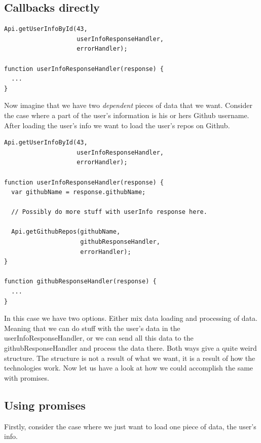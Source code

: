 \documentclass[a4paper,12pt]{article}
\begin{document}
\subsection{Callbacks directly}

\begin{lstlisting}[caption=Pseudo code showing a callback only approach, frame=single]
Api.getUserInfoById(43, 
                    userInfoResponseHandler, 
                    errorHandler);

function userInfoResponseHandler(response) {
  ...
}
\end{lstlisting}

Now imagine that we have two \emph{dependent} pieces of data that we want. Consider the case where a part of the user's information is
his or hers Github username. After loading the user's info we want to load the user's repos on Github.

\begin{lstlisting}[caption=Pseudo code showing a callback only approach where we are loading two pieces of data\, where the second is dependent on the first, frame=single]
Api.getUserInfoById(43, 
                    userInfoResponseHandler, 
                    errorHandler);

function userInfoResponseHandler(response) {
  var githubName = response.githubName;

  // Possibly do more stuff with userInfo response here.

  Api.getGithubRepos(githubName, 
                     githubResponseHandler, 
                     errorHandler);
}

function githubResponseHandler(response) {
  ...
}
\end{lstlisting}

In this case we have two options. Either mix data loading and processing of data. Meaning that we can do stuff with the user's data in the userInfoResponseHandler, or we
can send all this data to the githubResponseHandler and process the data there. Both ways give a quite weird structure. The structure is not a result of what we want,
it is a result of how the technologies work. Now let us have a look at how we could accomplish the same with promises.

\subsection{Using promises}
Firstly, consider the case where we just want to load one piece of data, the user's info.
\end{document}
